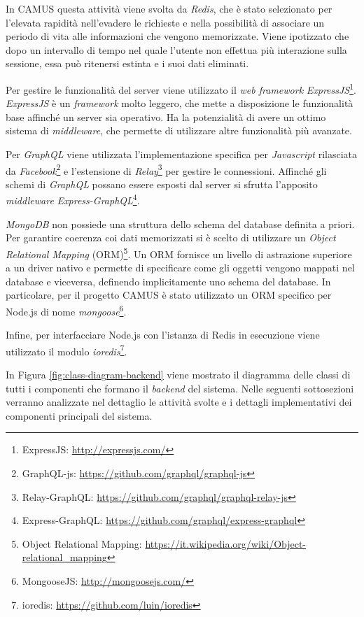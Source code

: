 In CAMUS questa attività viene svolta da \emph{Redis}, che è stato selezionato per l'elevata rapidità nell'evadere le richieste e nella possibilità di associare un periodo di vita alle informazioni che vengono memorizzate. Viene ipotizzato che dopo un intervallo di tempo nel quale l'utente non effettua più interazione sulla sessione, essa può ritenersi estinta e i suoi dati eliminati.

Per gestire le funzionalità del server viene utilizzato il \emph{web framework} \emph{ExpressJS}\footnote{ExpressJS: \url{http://expressjs.com/}}. \emph{ExpressJS} è un \emph{framework} molto leggero, che mette a disposizione le funzionalità base affinché un server sia operativo. Ha la potenzialità di avere un ottimo sistema di \emph{middleware}, che permette di utilizzare altre funzionalità più avanzate.

Per \emph{GraphQL} viene utilizzata l'implementazione specifica per \emph{Javascript} rilasciata da \emph{Facebook}\footnote{GraphQL-js: \url{https://github.com/graphql/graphql-js}} e l'estensione di \emph{Relay}\footnote{Relay-GraphQL: \url{https://github.com/graphql/graphql-relay-js}} per gestire le connessioni. Affinché gli schemi di \emph{GraphQL} possano essere esposti dal server si sfrutta l'apposito \emph{middleware} \emph{Express-GraphQL}\footnote{Express-GraphQL: \url{https://github.com/graphql/express-graphql}}.

\emph{MongoDB} non possiede una struttura dello schema del database definita a priori. Per garantire coerenza coi dati memorizzati si è scelto di utilizzare un \emph{Object Relational Mapping} (ORM)\footnote{Object Relational Mapping: \url{https://it.wikipedia.org/wiki/Object-relational_mapping}}. Un ORM fornisce un livello di astrazione superiore a un driver nativo e permette di specificare come gli oggetti vengono mappati nel database e viceversa, definendo implicitamente uno schema del database. In particolare, per il progetto CAMUS è stato utilizzato un ORM specifico per Node.js di nome \emph{mongoose}\footnote{MongooseJS: \url{http://mongoosejs.com/}}.

Infine, per interfacciare Node.js con l'istanza di Redis in esecuzione viene utilizzato il modulo \emph{ioredis}\footnote{ioredis: \url{https://github.com/luin/ioredis}}.

In Figura \ref{fig:class-diagram-backend} viene mostrato il diagramma delle classi di tutti i componenti che formano il \emph{backend} del sistema. Nelle seguenti sottosezioni verranno analizzate nel dettaglio le attività svolte e i dettagli implementativi dei componenti principali del sistema.

